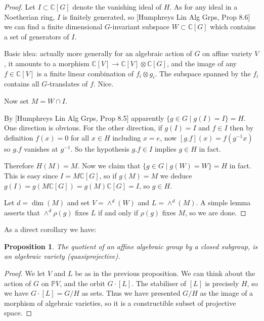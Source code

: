 \documentclass[12pt]{article}
\theoremstyle{plain}
\newtheorem{prop}[thm]{Proposition}
\theoremstyle{definition}
\numberwithin{equation}{section}
\newcommand{\C}{\mathbb{C}}
\newcommand{\bbP}{\mathbb{P}}
\begin{document}
\begin{proof}
Let $I \subset \C[G]$ denote the vanishing ideal of $H$. As for any ideal in a Noetherian ring, $I$ is finitely generated, so [Humphreys Lin Alg Grps, Prop 8.6] we can find a finite dimensional $G$-invariant subspace $W \subset \C[G]$ which contains a set of generators of $I$.

Basic idea: actually more generally for an algebraic action of $G$ on affine variety $V$, it amounts to a morphism $\C[V] \rightarrow \C[V] \otimes \C[G]$, and the image of any $f \in \C[V]$ is a finite linear combination of $f_i \otimes g_i$. The subspace spanned by the $f_i$ contains all $G$-translates of $f$. Nice.

Now set $M = W \cap I$.

By [Humphreys Lin Alg Grps, Prop 8.5] apparently $\{g \in G \mid g(I) = I\} = H$. One direction is obvious. For the other direction, if $g(I) = I$ and $f \in I$ then by definition $f(x) = 0$ for all $x \in H$ including $x = e$, now $[g . f](x) = f(g^{-1}x)$ so $g . f$ vanishes at $g^{-1}$. So the hypothesis $g .f \in I$ implies $g \in H$ in fact.

Therefore $H(M) = M$. Now we claim that $\{g \in G \mid g(W) = W\} = H$ in fact. This is easy since $I = M \C[G]$, so if $g(M) = M$ we deduce $g(I) = g(M\C[G]) = g(M)\C[G] = I$, so $g \in H$.

Let $d = \dim(M)$ and set $V = \wedge^d(W)$ and $L = \wedge^d(M)$. A simple lemma asserts that $\wedge^d\rho(g)$ fixes $L$ if and only if $\rho(g)$ fixes $M$, so we are done.
\end{proof}
As a direct corollary we have:
\begin{prop}
The quotient of an affine algebraic group by a closed subgroup, is an algebraic variety (quasiprojective).
\end{prop}

\begin{proof}
%
%

We let $V$ and $L$ be as in the previous proposition. We can think about the action of $G$ on $\bbP V$, and the orbit $G \cdot [L]$. The stabiliser of $[L]$ is precisely $H$, so we have $G \cdot [L] = G / H$ as sets. Thus we have presented $G / H$ as the image of a morphism of algebraic varieties, so it is a constructible subset of projective space.
\end{proof}
\end{document}
